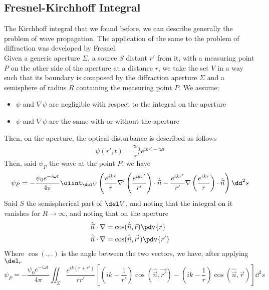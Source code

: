 \documentclass[../electromagnetism.tex]{subfiles}
\begin{document}
\subsection{Fresnel-Kirchhoff Integral}
The Kirchhoff integral that we found before, we can describe generally the problem of wave propagation. The application of the same to the problem of diffraction was developed by Fresnel.\\
Given a generic aperture $\Sigma$, a source $S$ distant $r'$ from it, with a measuring point $P$ on the other side of the aperture at a distance $r$, we take the set $V$ in a way such that its boundary is composed by the diffraction aperture $\Sigma$ and a semisphere of radius $R$ containing the measuring point $P$. We assume:
\begin{itemize}
\item $\psi$ and $\nabla\psi$ are negligible with respect to the integral on the aperture
\item $\psi$ and $\nabla\psi$ are the same with or without the aperture
\end{itemize}
Then, on the aperture, the optical disturbance is described as follows
\begin{equation*}
	\psi(r', t)=\frac{\psi_0}{r'}e^{ikr'-i\omega t}
\end{equation*}
Then, said $\psi_P$ the wave at the point $P$, we have
\begin{equation*}
	\psi_P=-\frac{\psi_0e^{-i\omega t}}{4\pi}\oiint_{\del V}\left( \frac{e^{ikr}}{r}\nabla'\left( \frac{e^{ikr'}}{r'} \right)\cdot\hat{\vec{n}}-\frac{e^{ikr'}}{r'}\nabla\left( \frac{e^{ikr}}{r} \right)\cdot\hat{\vec{n}} \right)\dd^2s
\end{equation*}
Said $S$ the semispherical part of $\del V$, and noting that the integral on it vanishes for $R\to\infty$, and noting that on the aperture
\begin{equation}
	\begin{aligned}
		\hat{\vec{n}}\cdot\nabla&= \cos(\hat{\vec{n}},\vec{r})\pdv{r}\\
		\hat{\vec{n}}\cdot\nabla&= \cos(\hat{\vec{n}},\vec{r'})\pdv{r'}
	\end{aligned}
	\label{eq:obliquityder.diff}
\end{equation}
Where $\cos(. ,.)$ is the angle between the two vectors, we have, after applying $\del_r$
\begin{equation}
	\psi_P=-\frac{\psi_0e^{-i\omega t}}{4\pi}\iint_\Sigma\frac{e^{ik(r+r')}}{rr'}\left[ \left( ik-\frac{1}{r'} \right)\cos(\hat{\vec{n}},\vec{r'})-\left( ik-\frac{1}{r} \right)\cos(\hat{\vec{n}},\vec{r}) \right]\dd^2s
	\label{eq:fresnelp1.diff}
\end{equation}
\end{document}

